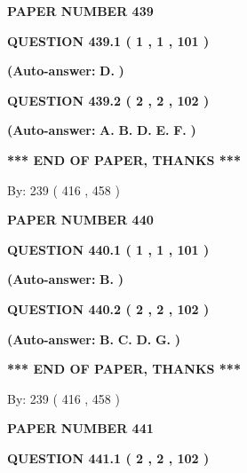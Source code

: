 \documentclass[12pt]{article}
\begin{document}
   
   
   
\newpage 
\setcounter{page}{ 
   439001 } 
   
   
 {\textbf{ \Large{ PAPER NUMBER  439  }}}
   
   
  
  
{\textbf{\large{QUESTION
439.1 
 ( 1 , 1 , 101 )
}}}
 
 
{\textbf{(Auto-answer:}}
{\textbf{\large{
D.}}}
{\textbf{)}}
 
 
  
  
{\textbf{\large{QUESTION
439.2 
 ( 2 , 2 , 102 )
}}}
 
 
{\textbf{(Auto-answer:}}
{\textbf{\large{
A.}}}
{\textbf{\large{
B.}}}
{\textbf{\large{
D.}}}
{\textbf{\large{
E.}}}
{\textbf{\large{
F.}}}
{\textbf{)}}
 
 
   
   
\vspace{1.0in} 
{\textbf{\large{ *** END OF PAPER, THANKS *** }}} 
   
   
\hspace{1.0in} By: 
 239 ( 416 ,  458 )
   
   
   
   
\newpage 
\setcounter{page}{ 
   440001 } 
   
   
 {\textbf{ \Large{ PAPER NUMBER  440  }}}
   
   
  
  
{\textbf{\large{QUESTION
440.1 
 ( 1 , 1 , 101 )
}}}
 
 
{\textbf{(Auto-answer:}}
{\textbf{\large{
B.}}}
{\textbf{)}}
 
 
  
  
{\textbf{\large{QUESTION
440.2 
 ( 2 , 2 , 102 )
}}}
 
 
{\textbf{(Auto-answer:}}
{\textbf{\large{
B.}}}
{\textbf{\large{
C.}}}
{\textbf{\large{
D.}}}
{\textbf{\large{
G.}}}
{\textbf{)}}
 
 
   
   
\vspace{1.0in} 
{\textbf{\large{ *** END OF PAPER, THANKS *** }}} 
   
   
\hspace{1.0in} By: 
 239 ( 416 ,  458 )
   
   
   
   
\newpage 
\setcounter{page}{ 
   441001 } 
   
   
 {\textbf{ \Large{ PAPER NUMBER  441  }}}
   
   
  
  
{\textbf{\large{QUESTION
441.1 
 ( 2 , 2 , 102 )
}}}
 
\end{document}
